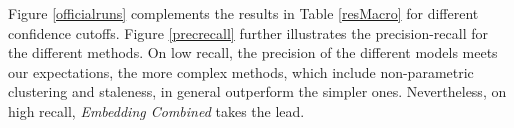 \documentclass{article}
\begin{document}
{{Figure \ref{officialruns} complements the results in Table \ref{resMacro} for different confidence cutoffs. %
Figure \ref{precrecall} further illustrates the precision-recall for the different methods. On low recall, the precision of the different models meets our expectations, the more complex methods, which include non-parametric clustering and staleness, in general outperform the simpler ones. Nevertheless, on high recall, {\textit{Embedding Combined}} takes the lead.



}}
\end{document}
